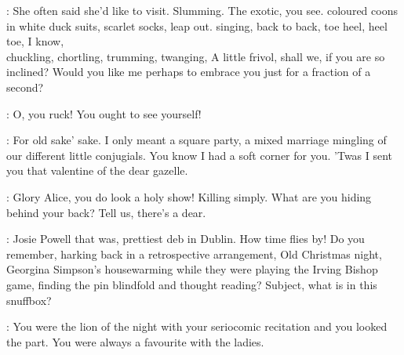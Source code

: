 \Bloom:
She often said she'd like to visit.
Slumming.
The exotic,
you see.
%
coloured coons in white duck suits,
scarlet socks,
leap out.
singing,
back to back,
toe heel,
heel toe,
%
I know,\\
%
chuckling,
chortling,
trumming,
twanging,
%
A little frivol,
shall we,
if you are so inclined?
Would you like me perhaps to embrace you
just for a fraction of a second?

\MrsBreen:
O,
you ruck!
You ought to see yourself!

\Bloom:
For old sake' sake.
I only meant a square party,
a mixed marriage
mingling of our different little conjugials.
You know I had a soft corner for you.
'Twas I sent you that valentine of the dear gazelle.

\MrsBreen:
Glory Alice,
you do look a holy show!
Killing simply.
What are you hiding behind your back?
Tell us,
there's a dear.

\Bloom:
Josie Powell that was,
prettiest deb in Dublin.
How time flies by!
Do you remember,
harking back
in a retrospective arrangement,
Old Christmas night,
Georgina Simpson's housewarming while they were playing the Irving Bishop game,
finding the pin blindfold and thought reading?
Subject,
what is in this snuffbox?

\MrsBreen:
You were the lion of the night
with your seriocomic recitation and you looked the part.
You were always a favourite with the ladies.

